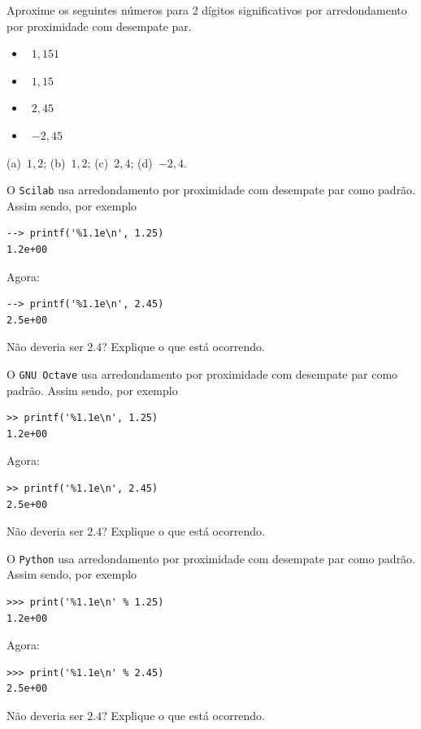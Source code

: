 \begin{exer}
  Aproxime os seguintes números para 2 dígitos significativos por arredondamento por proximidade com desempate par.
  \begin{itemize}
  \item[(a)]~$1,151$
  \item[(b)]~$1,15$
  \item[(c)]~$2,45$
  \item[(d)]~$-2,45$
  \end{itemize}
\end{exer}
\begin{resp}
  (a)~$1,2$; (b)~$1,2$; (c)~$2,4$; (d)~$-2,4$.
\end{resp}

\ifisscilab
\begin{exer}
  O \verb+Scilab+ usa arredondamento por proximidade com desempate par
  como padrão. Assim sendo, por exemplo
\begin{verbatim}
--> printf('%1.1e\n', 1.25) 
1.2e+00
\end{verbatim}
  Agora:
\begin{verbatim}
--> printf('%1.1e\n', 2.45)
2.5e+00
\end{verbatim}
  Não deveria ser $2.4$? Explique o que está ocorrendo.
\end{exer}
\fi
\ifisoctave
\begin{exer}
  O \verb+GNU Octave+ usa arredondamento por proximidade com desempate
  par como padrão. Assim sendo, por exemplo
\begin{verbatim}
>> printf('%1.1e\n', 1.25)
1.2e+00
\end{verbatim}
  Agora:
\begin{verbatim}
>> printf('%1.1e\n', 2.45)
2.5e+00
\end{verbatim}
  Não deveria ser $2.4$? Explique o que está ocorrendo.
\end{exer}
\fi
\ifisoctave
\begin{exer}
  O \verb+Python+ usa arredondamento por proximidade com desempate par
  como padrão. Assim sendo, por exemplo
\begin{verbatim}
>>> print('%1.1e\n' % 1.25)
1.2e+00
\end{verbatim}
  Agora:
\begin{verbatim}
>>> print('%1.1e\n' % 2.45)
2.5e+00
\end{verbatim}
  Não deveria ser $2.4$? Explique o que está ocorrendo.
\end{exer}
\fi


